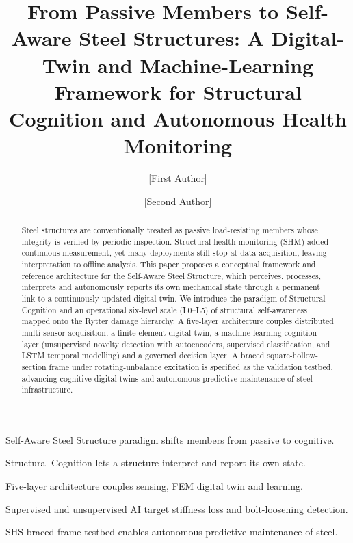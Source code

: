 \documentclass[preprint,12pt]{elsarticle}
\begin{document}
\begin{frontmatter}

\title{From Passive Members to Self-Aware Steel Structures: A Digital-Twin and
Machine-Learning Framework for Structural Cognition and Autonomous Health Monitoring}

\author[inst1]{[First Author]}

\author[inst1]{[Second Author]}



\begin{abstract}
Steel structures are conventionally treated as passive load-resisting members
whose integrity is verified by periodic inspection. Structural health monitoring
(SHM) added continuous measurement, yet many deployments still stop at data
acquisition, leaving interpretation to offline analysis. This paper proposes a
conceptual framework and reference architecture for the Self-Aware Steel
Structure, which perceives, processes, interprets and autonomously reports its
own mechanical state through a permanent link to a continuously updated digital
twin. We introduce the paradigm of Structural Cognition and an operational
six-level scale (L0--L5) of structural self-awareness mapped onto the Rytter
damage hierarchy. A five-layer architecture couples distributed multi-sensor
acquisition, a finite-element digital twin, a machine-learning cognition layer
(unsupervised novelty detection with autoencoders, supervised classification, and
LSTM temporal modelling) and a governed decision layer. A braced
square-hollow-section frame under rotating-unbalance excitation is specified as
the validation testbed, advancing cognitive digital twins and autonomous
predictive maintenance of steel infrastructure.
\end{abstract}

\begin{graphicalabstract}
\centering
\resizebox{0.96\linewidth}{!}{}
\end{graphicalabstract}

\begin{highlights}
\item Self-Aware Steel Structure paradigm shifts members from passive to cognitive.
\item Structural Cognition lets a structure interpret and report its own state.
\item Five-layer architecture couples sensing, FEM digital twin and learning.
\item Supervised and unsupervised AI target stiffness loss and bolt-loosening detection.
\item SHS braced-frame testbed enables autonomous predictive maintenance of steel.
\end{highlights}


\end{frontmatter}
\end{document}
